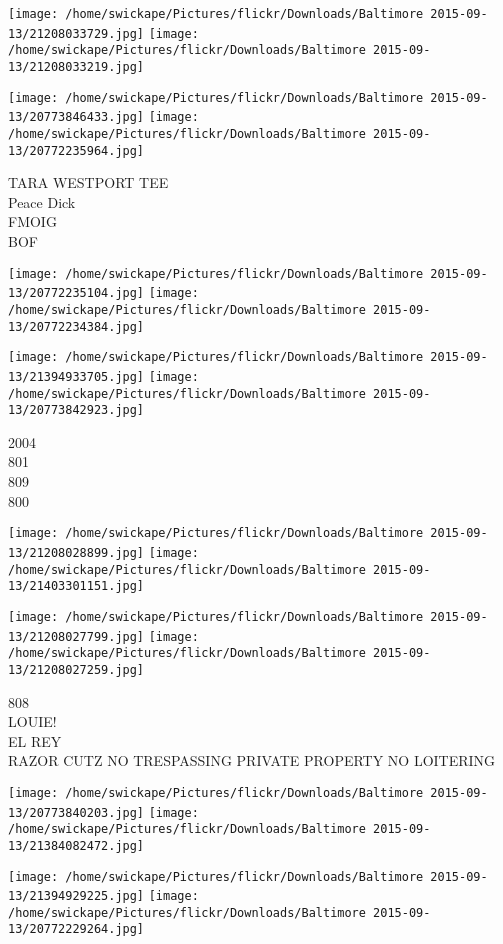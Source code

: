 \documentclass[10pt,letterpaper]{article}
\begin{document}
\texttt{[image: /home/swickape/Pictures/flickr/Downloads/Baltimore 2015-09-13/21208033729.jpg]}
\texttt{[image: /home/swickape/Pictures/flickr/Downloads/Baltimore 2015-09-13/21208033219.jpg]}

\texttt{[image: /home/swickape/Pictures/flickr/Downloads/Baltimore 2015-09-13/20773846433.jpg]}
\texttt{[image: /home/swickape/Pictures/flickr/Downloads/Baltimore 2015-09-13/20772235964.jpg]}

TARA WESTPORT TEE\\
Peace Dick\\
FMOIG\\
BOF
\pagebreak

\texttt{[image: /home/swickape/Pictures/flickr/Downloads/Baltimore 2015-09-13/20772235104.jpg]}
\texttt{[image: /home/swickape/Pictures/flickr/Downloads/Baltimore 2015-09-13/20772234384.jpg]}

\texttt{[image: /home/swickape/Pictures/flickr/Downloads/Baltimore 2015-09-13/21394933705.jpg]}
\texttt{[image: /home/swickape/Pictures/flickr/Downloads/Baltimore 2015-09-13/20773842923.jpg]}

2004\\
801\\
809\\
800
\pagebreak

\texttt{[image: /home/swickape/Pictures/flickr/Downloads/Baltimore 2015-09-13/21208028899.jpg]}
\texttt{[image: /home/swickape/Pictures/flickr/Downloads/Baltimore 2015-09-13/21403301151.jpg]}

\texttt{[image: /home/swickape/Pictures/flickr/Downloads/Baltimore 2015-09-13/21208027799.jpg]}
\texttt{[image: /home/swickape/Pictures/flickr/Downloads/Baltimore 2015-09-13/21208027259.jpg]}

808\\
LOUIE!\\
EL REY\\
RAZOR CUTZ NO TRESPASSING PRIVATE PROPERTY NO LOITERING
\pagebreak

\texttt{[image: /home/swickape/Pictures/flickr/Downloads/Baltimore 2015-09-13/20773840203.jpg]}
\texttt{[image: /home/swickape/Pictures/flickr/Downloads/Baltimore 2015-09-13/21384082472.jpg]}

\texttt{[image: /home/swickape/Pictures/flickr/Downloads/Baltimore 2015-09-13/21394929225.jpg]}
\texttt{[image: /home/swickape/Pictures/flickr/Downloads/Baltimore 2015-09-13/20772229264.jpg]}
\end{document}
